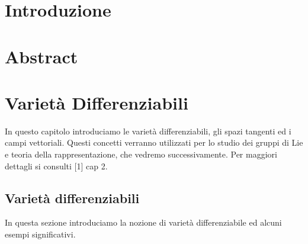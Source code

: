 \documentclass[12pt,a4paper]{report}
\theoremstyle{definition}
\theoremstyle{Theorem}
\theoremstyle{definition}
\theoremstyle{definition}
\theoremstyle{definition}
\begin{document}
	\chapter*{Introduzione}
	\chapter*{Abstract}
\chapter{Varietà Differenziabili}
In questo capitolo introduciamo le varietà differenziabili, gli spazi tangenti ed i campi vettoriali. Questi concetti verranno utilizzati per lo studio dei gruppi di Lie e teoria della rappresentazione, che vedremo successivamente. Per maggiori dettagli si consulti [1] cap 2.
\section{Varietà differenziabili}
In questa sezione introduciamo la nozione di varietà differenziabile ed alcuni esempi significativi. 
\end{document}
